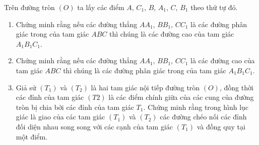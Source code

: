 \begin{vd}
Trên đường tròn $(O)$ ta lấy các điểm $A$, $C_1$, $B$,  $A_1$, $C$, $B_1$ theo thứ tự đó.
\begin{enumerate}
\item Chứng minh rằng nếu các đường thẳng $AA_1$, $BB_1$, $CC_1$ là các đường phân giác trong của tam giác $ABC$ thì chúng là các đường cao của tam giác $A_1B_1C_1$.
\item  Chứng minh rằng nếu các đường thẳng $AA_1$, $BB_1$, $CC_1$ là các đường cao của tam giác $ABC$ thì chúng là các đường phân giác trong của tam giác $A_1B_1C_1$.
\item Giả sử $(T_1)$ và $(T_2)$ là hai tam giác nội tiếp đường tròn $(O)$, đồng thời các đỉnh của tam giác $(T2)$ là các điểm chính giữa của các cung của đường tròn bị chia bởi các đỉnh của tam giác $T_1$. Chứng minh rằng trong hình lục giác là giao của các tam giác $(T_1)$ và $(T_2)$ các đường chéo nối các đỉnh đối diện nhau song song với các cạnh của tam giác $(T_1)$ và đồng quy tại một điểm.
\end{enumerate}
\end{vd}
